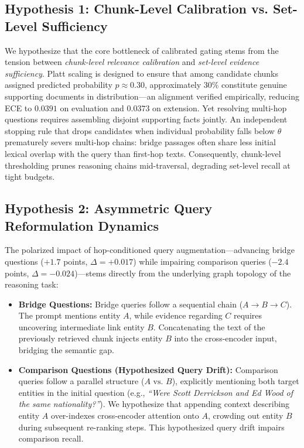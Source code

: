 \documentclass{article}
\begin{document}
\subsection{Hypothesis 1: Chunk-Level Calibration vs. Set-Level Sufficiency}
We hypothesize that the core bottleneck of calibrated gating stems from the tension between \textit{chunk-level relevance calibration} and \textit{set-level evidence sufficiency}. Platt scaling is designed to ensure that among candidate chunks assigned predicted probability $\hat{p} \approx 0.30$, approximately 30\% constitute genuine supporting documents in distribution—an alignment verified empirically, reducing ECE to $0.0391$ on evaluation and $0.0373$ on extension. Yet resolving multi-hop questions requires assembling disjoint supporting facts jointly. An independent stopping rule that drops candidates when individual probability falls below $\theta$ prematurely severs multi-hop chains: bridge passages often share less initial lexical overlap with the query than first-hop texts. Consequently, chunk-level thresholding prunes reasoning chains mid-traversal, degrading set-level recall at tight budgets.

\subsection{Hypothesis 2: Asymmetric Query Reformulation Dynamics}
The polarized impact of hop-conditioned query augmentation—advancing bridge questions ($+1.7$ points, $\Delta = +0.017$) while impairing comparison queries ($-2.4$ points, $\Delta = -0.024$)—stems directly from the underlying graph topology of the reasoning task:
\begin{itemize}\setlength{\itemsep}{1pt}\setlength{\parskip}{0pt}
    \item \textbf{Bridge Questions:} Bridge queries follow a sequential chain ($A \to B \to C$). The prompt mentions entity $A$, while evidence regarding $C$ requires uncovering intermediate link entity $B$. Concatenating the text of the previously retrieved chunk injects entity $B$ into the cross-encoder input, bridging the semantic gap.
    \item \textbf{Comparison Questions (Hypothesized Query Drift):} Comparison queries follow a parallel structure ($A \text{ vs. } B$), explicitly mentioning both target entities in the initial question (e.g., \textit{``Were Scott Derrickson and Ed Wood of the same nationality?''}). We hypothesize that appending context describing entity $A$ over-indexes cross-encoder attention onto $A$, crowding out entity $B$ during subsequent re-ranking steps. This hypothesized query drift impairs comparison recall.
\end{itemize}
\end{document}
